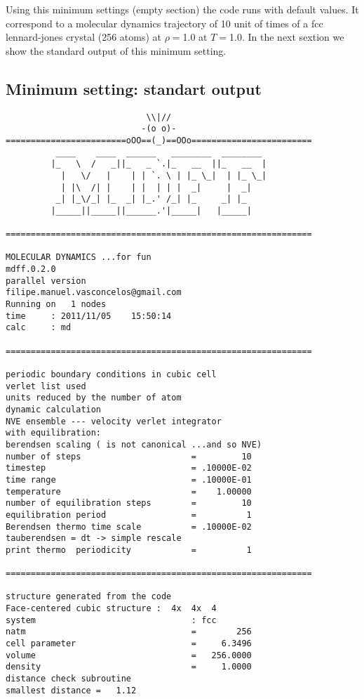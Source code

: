\documentclass[10pt,a4paper]{article}
\begin{document}
Using this minimum settings (empty section) the code runs with default values.
It correspond to a molecular dynamics trajectory of 10 unit of times of a fcc lennard-jones 
crystal (256 atoms) at $\rho=$1.0 at $T=$1.0. In the next sextion we show the standard output of this minimum setting. 

\clearpage
\subsection{Minimum setting: standart output}
\begin{verbatim}
                            \\|//                    
                           -(o o)-                           
========================oOO==(_)==OOo========================
          ____    ____  ______   ________  ________  
         |_   \  /   _||_   _ `.|_   __  ||_   __  | 
           |   \/   |    | | `. \ | |_ \_|  | |_ \_| 
           | |\  /| |    | |  | | |  _|     |  _|    
          _| |_\/_| |_  _| |_.' /_| |_     _| |_     
         |_____||_____||______.'|_____|   |_____|    
  
=============================================================

MOLECULAR DYNAMICS ...for fun                 
mdff.0.2.0
parallel version
filipe.manuel.vasconcelos@gmail.com  
Running on   1 nodes                  
time     : 2011/11/05    15:50:14
calc     : md                                                          

=============================================================

periodic boundary conditions in cubic cell     
verlet list used 
units reduced by the number of atom
dynamic calculation
NVE ensemble --- velocity verlet integrator    
with equilibration:             
berendsen scaling ( is not canonical ...and so NVE)
number of steps                      =         10
timestep                             = .10000E-02
time range                           = .10000E-01
temperature                          =    1.00000
number of equilibration steps        =         10
equilibration period                 =          1
Berendsen thermo time scale          = .10000E-02
tauberendsen = dt -> simple rescale
print thermo  periodicity            =          1

=============================================================

structure generated from the code
Face-centered cubic structure :  4x  4x  4  
system                               : fcc                                                         
natm                                 =        256
cell parameter                       =     6.3496
volume                               =   256.0000
density                              =     1.0000
distance check subroutine
smallest distance =   1.12


\end{verbatim}
\end{document}

